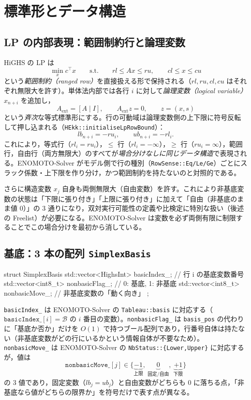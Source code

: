 \documentclass[11pt,a4paper]{ltjsarticle}
\newcommand{\code}[1]{\texttt{#1}}
\begin{document}
\section{標準形とデータ構造}

\subsection{LP の内部表現：範囲制約行と論理変数}

HiGHS の LP は
\[
  \min_x c^\top x \qquad \text{s.t.} \qquad rl \le Ax \le ru, \qquad cl \le x \le cu
\]
という\emph{範囲制約（ranged row）}を直接扱える形で保持される（$rl,ru,cl,cu$ はそれぞれ無限大を許す）。単体法内部では各行 $i$ に対して\emph{論理変数（logical variable）} $x_{n+i}$ を追加し，
\[
  A_{\mathrm{ext}} = [A \mid I], \qquad A_{\mathrm{ext}} z = 0, \qquad z = (x, s)
\]
という\emph{斉次}な等式標準形にする。行の可動域は論理変数側の上下限に符号反転して押し込まれる（\code{HEkk::initialiseLpRowBound}）：
\[
  lb_{n+i} = -ru_i, \qquad ub_{n+i} = -rl_i .
\]
これにより，等式行（$rl_i=ru_i$），$\le$ 行（$rl_i=-\infty$），$\ge$ 行（$ru_i=\infty$），範囲行，自由行（両方無限大）のすべてが\emph{場合分けなしに同じデータ構造}で表現される。ENOMOTO-Solver がモデル側で行の種別（\code{RowSense::Eq/Le/Ge}）ごとにスラック係数・上下限を作り分け，かつ範囲制約を持たないのと対照的である。

さらに構造変数 $x_j$ 自身も両側無限大（自由変数）を許す。これにより非基底変数の状態は「下限に張り付き」「上限に張り付き」に加えて「自由（非基底のまま値 $0$）」の 3 通りになり，双対実行可能性の定義や比検定に特別な扱い（後述の Freelist）が必要になる。ENOMOTO-Solver は変数を必ず両側有限に制限することでこの場合分けを最初から消している。

\subsection{基底：3 本の配列 \code{SimplexBasis}}

\begin{cppcode}
struct SimplexBasis {
  std::vector<HighsInt> basicIndex_;   // 行 i の基底変数番号
  std::vector<int8_t>   nonbasicFlag_; // 0: 基底, 1: 非基底
  std::vector<int8_t>   nonbasicMove_; // 非基底変数の「動く向き」
};
\end{cppcode}
\code{basicIndex\_} は ENOMOTO-Solver の \code{Tableau::basis} に対応する（$\code{basicIndex\_}[i] = \mathcal B$ の $i$ 番目の変数）。\code{nonbasicFlag\_} は \code{basis\_pos} の代わりに「基底か否か」だけを $O(1)$ で持つブール配列であり，行番号自体は持たない（非基底変数がどの行にいるかという情報自体が不要なため）。\code{nonbasicMove\_} は ENOMOTO-Solver の \code{NbStatus::\{Lower,Upper\}} に対応するが，値は
\[
  \code{nonbasicMove\_}[j] \in \{\underbrace{-1}_{\text{上限}},\ \underbrace{0}_{\text{固定/自由}},\ \underbrace{+1}_{\text{下限}}\}
\]
の 3 値であり，固定変数（$lb_j=ub_j$）と自由変数がどちらも $0$ に落ちる点，「非基底なら値がどちらの限界か」を符号だけで表す点が異なる。
\end{document}
